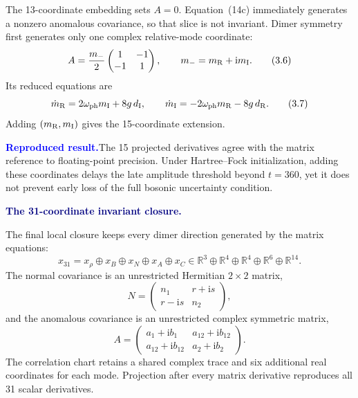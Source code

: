 \documentclass[10pt]{article}
\newcommand{\ii}{\mathrm i}
\newcommand{\R}{\mathbb R}
\newcommand{\evidencebox}[1]{%
  \par\medskip
  \noindent\colorbox{paleblue}{%
    \parbox{\dimexpr\linewidth-2\fboxsep\relax}{%
      \textcolor{blue}{\textbf{Reproduced result.}}\quad #1%
    }%
  }\par\medskip
}
\newcommand{\flowlead}[1]{%
  \par\medskip
  \needspace{3\baselineskip}%
  \noindent\textcolor{navy}{\textbf{#1.}}\enspace\ignorespaces
}
\begin{document}
The 13-coordinate embedding sets \(A=0\).  Equation~(14c) immediately
generates a nonzero anomalous covariance, so that slice is not invariant.
Dimer symmetry first generates only one complex relative-mode coordinate:
\[
A=\frac{m_-}{2}
\begin{pmatrix}1&-1\\-1&1\end{pmatrix},
\qquad
m_-=m_{\rm R}+\ii m_{\rm I}.
\tag{3.6}
\]
Its reduced equations are
\[
\dot m_{\rm R}=2\omega_{\rm ph}m_{\rm I}+8g\,d_{\rm I},
\qquad
\dot m_{\rm I}=-2\omega_{\rm ph}m_{\rm R}-8g\,d_{\rm R}.
\tag{3.7}
\]
Adding \((m_{\rm R},m_{\rm I})\) gives the 15-coordinate extension.

\evidencebox{The 15 projected derivatives agree with the matrix reference to
floating-point precision.  Under Hartree--Fock initialization, adding these
coordinates delays the late amplitude threshold beyond \(t=360\), yet it does
not prevent early loss of the full bosonic uncertainty condition.}

\flowlead{The 31-coordinate invariant closure}

The final local closure keeps every dimer direction generated by the matrix
equations:
\[
x_{31}
=x_\rho\oplus x_B\oplus x_N\oplus x_A\oplus x_C
\in\R^{3}\oplus\R^{4}\oplus\R^{4}\oplus\R^{6}\oplus\R^{14}.
\tag{3.8}
\]
The normal covariance is an unrestricted Hermitian \(2\times2\) matrix,
\[
N=
\begin{pmatrix}n_1&r+\ii s\\r-\ii s&n_2\end{pmatrix},
\tag{3.9}
\]
and the anomalous covariance is an unrestricted complex symmetric matrix,
\[
A=
\begin{pmatrix}
a_1+\ii b_1&a_{12}+\ii b_{12}\\
a_{12}+\ii b_{12}&a_2+\ii b_2
\end{pmatrix}.
\tag{3.10}
\]
The correlation chart retains a shared complex trace and six additional real
coordinates for each mode.  Projection after every matrix derivative
reproduces all 31 scalar derivatives.
\end{document}
